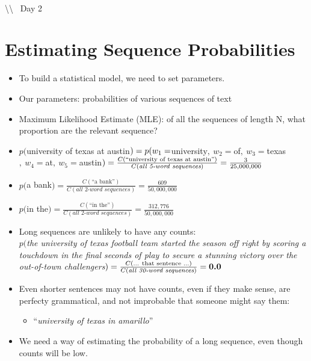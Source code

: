 \documentclass[11pt,letterpaper]{article}
\newcommand{\bs}{\textbackslash}
\begin{document}
~\\ \bs\bs~ Day 2

\section{Estimating Sequence Probabilities}

\begin{itemize}
  \item To build a statistical model, we need to set parameters.
  \item Our parameters: probabilities of various sequences of text
  \item Maximum Likelihood Estimate (MLE): of all the sequences of length N, what proportion are the relevant sequence?
  \item $p($university of texas at austin$) \vspace{1mm} \\
        = p(w_1=$university$, ~ w_2=$of$, ~ w_3=$texas$, ~ w_4=$at$, ~ w_5=$austin$) \vspace{1mm} \\
        = \frac{C(\text{``university of texas at austin''})}{C(\textit{all 5-word sequences})}
        = \frac {3}{25,000,000}$
  \\
  \item $p($a bank$) = \frac{C(\text{``a bank''})}{C(\textit{all 2-word sequences})} = \frac{609}{50,000,000}$
  \item $p($in the$) = \frac{C(\text{``in the''})}{C(\textit{all 2-word sequences})} = \frac{312,776}{50,000,000}$
  \\
  \item Long sequences are unlikely to have any counts: \vspace{1mm} \\
  $p($\textsl{the university of texas football team started the season off right by scoring a touchdown in the final seconds of play to secure a stunning victory over the out-of-town challengers}$) \vspace{1mm} \\
  = \frac{C(\text{... that sentence ...})}{C(\textit{all 30-word sequences})} = \textbf{0.0}$
  \item Even shorter sentences may not have counts, even if they make sense, are perfecty grammatical, and not improbable that someone might say them: 
    \begin{itemize} \item ``\textsl{university of texas in amarillo}'' \end{itemize}
  \item We need a way of estimating the probability of a long sequence, even though counts will be low.
\end{itemize}
\end{document}
